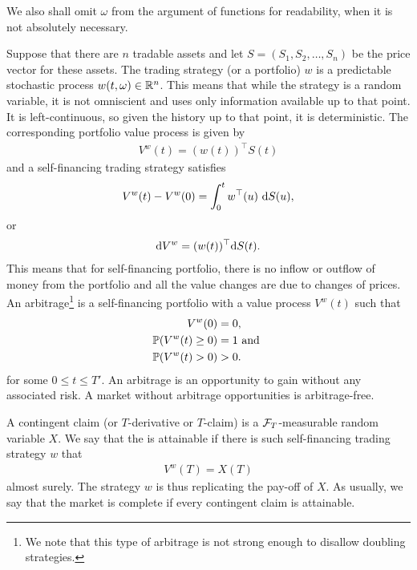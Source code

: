 We also shall omit $\omega$ from the argument of functions for readability, when it is not absolutely necessary.

Suppose that there are $n$ tradable assets and let $S = (S_1, S_2, \ldots, S_n)$ be the price vector for these assets. The trading strategy (or a portfolio) $w$ is a predictable stochastic process $w(t,\omega) \in \mathbb{R}^n$. This means that while the strategy is a random variable, it is not omniscient and uses only information available up to that point. It is left-continuous, so given the history up to that point, it is deterministic. The corresponding portfolio value process is given by
  \begin{align}
    V^w (t) = (w(t))^{\top} S(t)
  \end{align}
and a self-financing trading strategy satisfies
	\begin{align}
		V^w(t) - V^w(0) = \int_0^t w^{\top}(u) \ \mathrm{d} S(u),
	\end{align}
or
  \begin{align}
    \mathrm{d} V^w = (w(t))^{\top} \mathrm{d} S(t) .
  \end{align}
This means that for self-financing portfolio, there is no inflow or outflow of money from the portfolio and all the value changes are due to changes of prices. An arbitrage\footnote{We note that this type of arbitrage is not strong enough to disallow doubling strategies.} is a self-financing portfolio with a value process $V^w (t)$ such that
  \begin{align}
    V^w(0) &= 0, \\
    \mathbb{P} (V^w(t) \geq 0 ) &= 1 \textup{ and } \\
    \mathbb{P} (V^w(t) > 0 ) &> 0.
  \end{align}
 for some $0 \leq t \leq T'$. An arbitrage is an opportunity to gain without any associated risk. A market without arbitrage opportunities is arbitrage-free. 
  
A contingent claim (or $T$-derivative or $T$-claim) is a $\mathcal{F}_T$-measurable random variable $X$. We say that the is attainable if there is such self-financing trading strategy $w$ that
  \begin{align}
    V^w(T) = X(T)
  \end{align}
almost surely. The strategy $w$ is thus replicating the pay-off of $X$. As usually, we say that the market is complete if every contingent claim is attainable.
  
